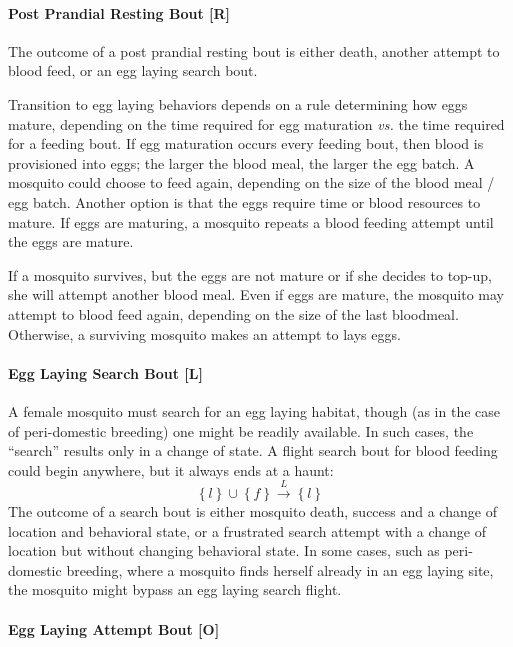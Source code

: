 \documentclass{article}
\begin{document}
\paragraph{Post Prandial Resting Bout [R]}

The outcome of a post prandial resting bout is either death,
another attempt to blood feed, or an egg laying search bout.

Transition to egg laying behaviors depends on a rule determining
how eggs mature, depending on the time required for egg
maturation {\em vs.} the time required for a feeding bout. If egg
maturation occurs every feeding bout, then blood is provisioned
into eggs; the larger the blood meal, the larger the egg batch. A
mosquito could choose to feed again, depending on the size of the
blood meal / egg batch. Another option is that the eggs require
time or blood resources to mature. If eggs are maturing, a
mosquito repeats a blood feeding attempt until the eggs are
mature.

If a mosquito survives, but the eggs are not mature or if she
decides to top-up, she will attempt another blood meal. Even if
eggs are mature, the mosquito may attempt to blood feed again,
depending on the size of the last bloodmeal. Otherwise, a
surviving mosquito makes an attempt to lays eggs.

\paragraph{Egg Laying Search Bout [L]}

A female mosquito must search for an egg laying habitat, though
(as in the case of peri-domestic breeding) one might be readily
available. In such cases, the ``search'' results only in a change
of state. A flight search bout for blood feeding could begin
anywhere, but it always ends at a haunt:
%
\begin{equation}
%
\left\{ l\right\}  \cup \left\{ f\right\}
\overset{L}{\rightarrow} \left\{ l\right\}
%
\end{equation}
%
The outcome of a search bout is either mosquito death, success
and a change of location and behavioral state, or a frustrated
search attempt with a change of location but without changing
behavioral state. In some cases, such as peri-domestic breeding,
where a mosquito finds herself already in an egg laying site, the
mosquito might bypass an egg laying search flight.

\paragraph{Egg Laying Attempt Bout [O]}
\end{document}
